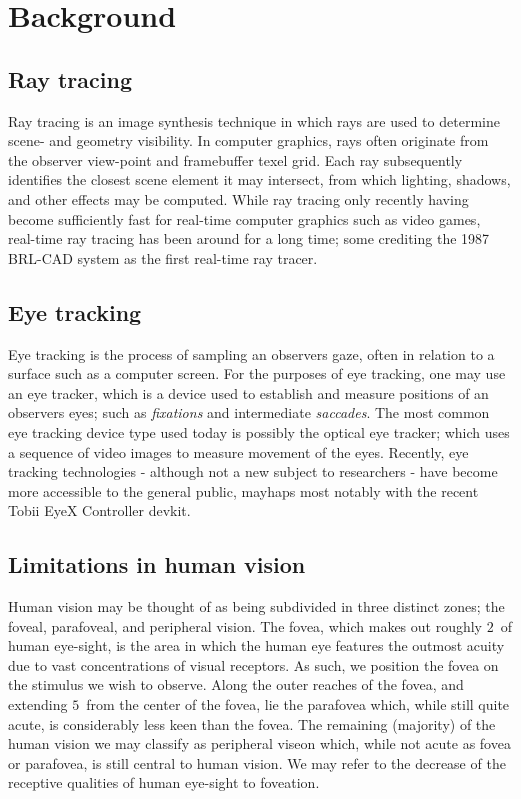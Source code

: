 \section{Background}
\subsection{Ray tracing}
Ray tracing is an image synthesis technique in which rays are used to determine scene- and geometry visibility.
In computer graphics, rays often originate from the observer view-point and framebuffer texel grid.
Each ray subsequently identifies the closest scene element it may intersect, from which lighting, shadows, and other effects may be computed.
While ray tracing only recently having become sufficiently fast for real-time computer graphics such as video games, real-time ray tracing has been around for a long time; some crediting the 1987 BRL-CAD system as the first real-time ray tracer\cite{stay87}.

\subsection{Eye tracking}
Eye tracking is the process of sampling an observers gaze, often in relation to a surface such as a computer screen.
For the purposes of eye tracking, one may use an eye tracker, which is a device used to establish and measure positions of an observers eyes\cite{duchowski07}; such as \textit{fixations} and intermediate \textit{saccades}\cite{rayner98}.
The most common eye tracking device type used today is possibly the optical eye tracker; which uses a sequence of video images to measure movement of the eyes\cite{duchowski07}.
Recently, eye tracking technologies - although not a new subject to researchers - have become more accessible to the general public, mayhaps most notably with the recent Tobii EyeX Controller devkit.

\subsection{Limitations in human vision}
Human vision may be thought of as being subdivided in three distinct zones; the foveal, parafoveal, and peripheral vision\cite{rayner98}.
The fovea, which makes out roughly $2$\degree\ of human eye-sight, is the area in which the human eye features the outmost acuity due to vast concentrations of visual receptors.
As such, we position the fovea on the stimulus we wish to observe.
Along the outer reaches of the fovea, and extending $5$\degree\ from the center of the fovea, lie the parafovea which, while still quite acute, is considerably less keen than the fovea.
The remaining (majority) of the human vision we may classify as peripheral viseon which, while not acute as fovea or parafovea, is still central to human vision.
We may refer to the decrease of the receptive qualities of human eye-sight to foveation.

